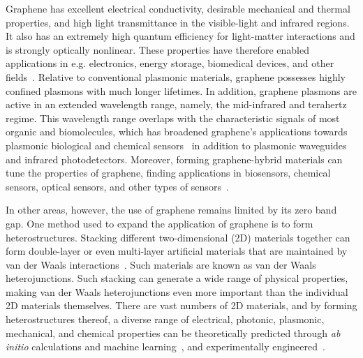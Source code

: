 Graphene has excellent electrical conductivity,
desirable mechanical and thermal properties,
and high light transmittance in the visible-light and infrared regions.
It also has an extremely high quantum efficiency for light-matter interactions and is strongly optically nonlinear.
These properties have therefore enabled applications in e.g. electronics, energy storage, biomedical devices, and other fields~\cite{janavika2023graphene}.
Relative to conventional plasmonic materials, graphene possesses highly confined plasmons with much longer lifetimes.
In addition, graphene plasmons are active in an extended wavelength range, namely, the mid-infrared and terahertz regime.
This wavelength range overlaps with the characteristic signals of most organic and biomolecules,
which has broadened graphene's applications towards plasmonic biological and chemical sensors~\cite{sakthivel2023} in addition to plasmonic waveguides
and infrared photodetectors.
Moreover, forming graphene-hybrid materials can tune the properties of graphene, finding applications in biosensors, chemical sensors, optical sensors, and other types of sensors~\cite{zhang2022}.

In other areas, however, the use of graphene remains limited by its zero band gap.
One method used to expand the application of graphene is to form heterostructures.
Stacking different two-dimensional (2D) materials together can form double-layer or even multi-layer artificial materials that are maintained by van der Waals interactions~\cite{novoselov20162d}.
Such materials are known as van der Waals heterojunctions.
Such stacking can generate a wide range of physical properties,
making van der Waals heterojunctions even more important than the individual 2D materials themselves.
There are vast numbers of 2D materials, and by forming heterostructures thereof,
a diverse range of electrical, photonic, plasmonic, mechanical, and chemical properties can be theoretically predicted through \textit{ab initio} calculations and machine learning~\cite{thygesen2017,he2023}, and experimentally engineered~\cite{lin2023recent,elbanna20232d}.

